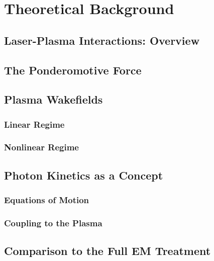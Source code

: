 \newpage
\section{Theoretical Background}

\subsection{Laser-Plasma Interactions: Overview}
\subsection{The Ponderomotive Force}

\subsection{Plasma Wakefields}
\subsubsection{Linear Regime}
\subsubsection{Nonlinear Regime}

\subsection{Photon Kinetics as a Concept}
\subsubsection{Equations of Motion}
\subsubsection{Coupling to the Plasma}

\subsection{Comparison to the Full EM Treatment}



